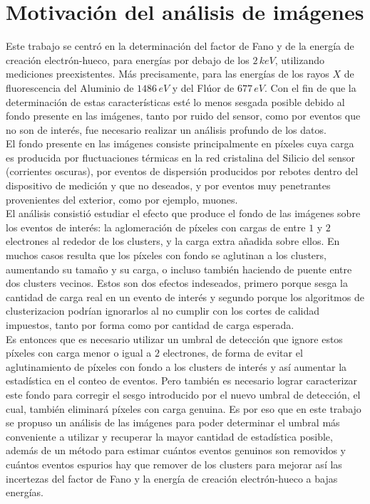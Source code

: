 \section{Motivación del análisis de imágenes}
\noindent Este trabajo se centró en la determinación del factor de Fano y de la energía de creación electrón-hueco, para energías por debajo de los $2\,\si{keV}$, utilizando mediciones preexistentes. Más precisamente, para las energías de los rayos $X$ de fluorescencia del Aluminio de $1486\,\si{eV}$ y del Flúor de $677\,\si{eV}$. Con el fin de que la determinación de estas características esté lo menos sesgada posible debido al fondo presente en las imágenes, tanto por ruido del sensor, como por eventos que no son de interés, fue necesario realizar un análisis profundo de los datos.\\
\indent El fondo presente en las imágenes consiste principalmente en píxeles cuya carga es producida por fluctuaciones térmicas en la red cristalina del Silicio del sensor (corrientes oscuras), por eventos de dispersión producidos por rebotes dentro del dispositivo de medición y que no deseados, y por eventos muy penetrantes provenientes del exterior, como por ejemplo, muones.\\
\indent El análisis consistió estudiar el efecto que produce el fondo de las imágenes sobre los eventos de interés: la aglomeración de píxeles con cargas de entre $1$ y $2$ electrones al rededor de los clusters, y la carga extra añadida sobre ellos. En muchos casos resulta que los píxeles con fondo se aglutinan a los clusters, aumentando su tamaño y su carga, o incluso también haciendo de puente entre dos clusters vecinos. Estos son dos efectos indeseados, primero porque sesga la cantidad de carga real en un evento de interés y segundo porque los algoritmos de clusterizacion podrían ignorarlos al no cumplir con los cortes de calidad impuestos, tanto por forma como por cantidad de carga esperada.\\
\indent Es entonces que es necesario utilizar un umbral de detección que ignore estos píxeles con carga menor o igual a $2$ electrones, de forma de evitar el aglutinamiento de píxeles con fondo a los clusters de interés y así aumentar la estadística en el conteo de eventos. Pero también es necesario lograr caracterizar este fondo para corregir el sesgo introducido por el nuevo umbral de detección, el cual, también eliminará píxeles con carga genuina. Es por eso que en este trabajo se propuso un análisis de las imágenes para poder determinar el umbral más conveniente a utilizar y recuperar la mayor cantidad de estadística posible, además de un método para estimar cuántos eventos genuinos son removidos y cuántos eventos espurios hay que remover de los clusters para mejorar así las incertezas del factor de Fano y la energía de creación electrón-hueco a bajas energías.
